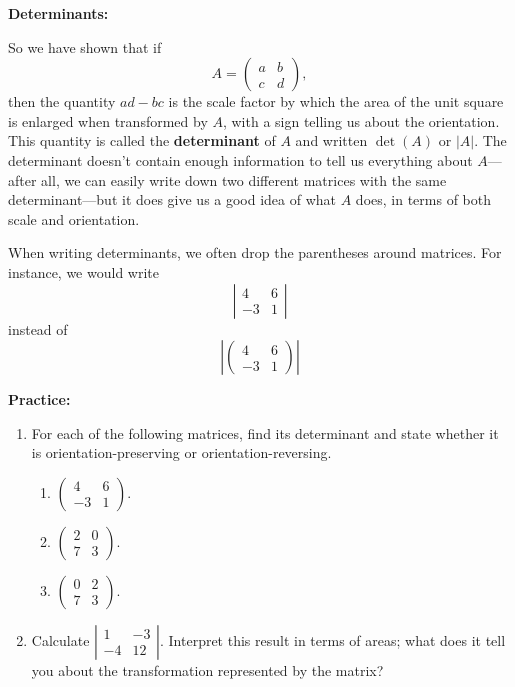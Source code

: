 \documentclass{article}
\begin{document}
\clearpage



\textbf{Determinants:}\bigskip

So we have shown that if
\[A=\left(\begin{array}{cc}a&b\\c&d\end{array}\right),\]
then the quantity $ad-bc$ is the scale factor by which the area of the unit square is enlarged when transformed by $A$, with a sign telling us about the orientation. This quantity is called the \textbf{determinant} of $A$ and written $\det(A)$ or $|A|$. The determinant doesn't contain enough information to tell us everything about $A$---after all, we can easily write down two different matrices with the same determinant---but it does give us a good idea of what $A$ does, in terms of both scale and orientation.

When writing determinants, we often drop the parentheses around matrices. For instance, we would write
\[\left|\begin{array}{cc}4&6\\-3&1\end{array}\right|\]
instead of
\[\left|\left(\begin{array}{cc}4&6\\-3&1\end{array}\right)\right|\]

\bigskip


\textbf{Practice:}\bigskip

\begin{enumerate}
	\item For each of the following matrices, find its determinant and state whether it is orientation-preserving or orientation-reversing.
		\begin{enumerate}
			\item $\left(\begin{array}{cc}4&6\\-3&1\end{array}\right)$.
			\item $\left(\begin{array}{cc}2&0\\7&3\end{array}\right)$.
			\item $\left(\begin{array}{cc}0&2\\7&3\end{array}\right)$.
		\end{enumerate}
	\item Calculate $\left|\begin{array}{cc}1&-3\\-4&12\end{array}\right|$. Interpret this result in terms of areas; what does it tell you about the transformation represented by the matrix?
\end{enumerate}
\end{document}
